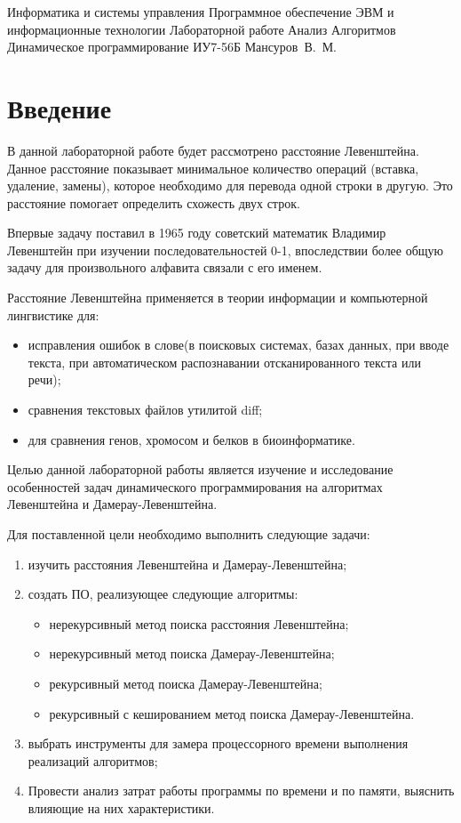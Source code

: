 \documentclass[a4paper,14pt, unknownkeysallowed]{bmstu}
\author{Мансуров Владислав Михайлович}
\begin{document}
	\makereporttitle
	{Информатика и системы управления}
	{Программное обеспечение ЭВМ и информационные технологии}
	{Лабораторной работе}
	{Анализ Алгоритмов}
	{Динамическое программирование}
	{}
	{ИУ7-56Б}
	{Мансуров~В.~М.}
	{}

	\maketableofcontents
	\setcounter{page}{1}

\chapter*{Введение}

	В данной лабораторной работе будет рассмотрено расстояние Левенштейна. Данное расстояние показывает минимальное количество операций (вставка, удаление, замены), которое необходимо для перевода одной строки в другую. Это расстояние помогает определить схожесть двух строк.

	Впервые задачу поставил в 1965 году советский математик Владимир Левенштейн при изучении последовательностей 0-1, впоследствии более общую задачу для произвольного алфавита связали с его именем.

	Расстояние Левенштейна применяется в теории информации и компьютерной лингвистике для:
	\begin{itemize}
    	\item исправления ошибок в слове(в поисковых системах, базах данных, при вводе текста, при автоматическом распознавании отсканированного текста или речи);
    	\item сравнения текстовых файлов утилитой diff;
    	\item для сравнения генов, хромосом и белков в биоинформатике.
    \end{itemize}

	Целью данной лабораторной работы является изучение и исследование особенностей задач динамического программирования на алгоритмах Левенштейна и Дамерау-Левенштейна.

	Для поставленной цели необходимо выполнить следующие задачи:
	\begin{enumerate}[label={\arabic*)}]
	    \item изучить расстояния Левенштейна и Дамерау-Левенштейна;
	    \item создать ПО, реализующее следующие алгоритмы:
	    \begin{itemize}
    	    \item нерекурсивный метод поиска расстояния Левенштейна;
    	    \item нерекурсивный метод поиска Дамерау-Левенштейна;
    	    \item рекурсивный метод поиска Дамерау-Левенштейна;
    	    \item  рекурсивный с кешированием метод поиска Дамерау-Левенштейна.
        \end{itemize}
        \item выбрать инструменты для замера процессорного времени выполнения реализаций алгоритмов;
        \item Провести анализ затрат работы программы по времени и по памяти, выяснить влияющие на них характеристики.
    \end{enumerate}
\end{document}
